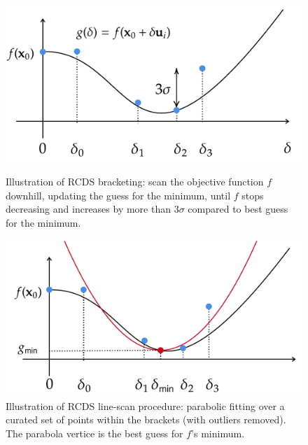 \begin{figure}
    \begin{minipage}{0.48\textwidth}
        \centering
        \includegraphics[width=\textwidth]{Images/bracketing.pdf}
        \caption{Illustration of RCDS bracketing: scan the objective function $f$ downhill, updating the guess for the minimum, until $f$ stops decreasing and increases by more than $3\sigma$ compared to best guess for the minimum.}
    \end{minipage}
    \hfill
    \begin{minipage}{0.48\textwidth}
        \centering
        \includegraphics[width=\textwidth]{Images/linescan.pdf}
        \caption{Illustration of RCDS line-scan procedure: parabolic fitting over a curated set of points within the brackets (with outliers removed). The parabola vertice is the best guess for $f$'s minimum.}
    \end{minipage}
\end{figure}
